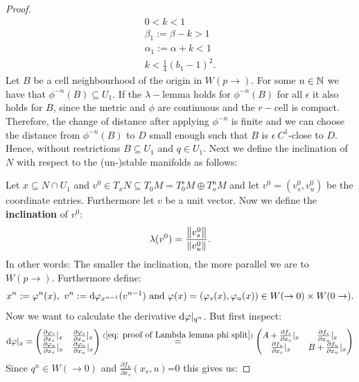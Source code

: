 \begin{proof}
\begin{gather*}
0<k<1 \\
\beta_1:=\beta -k >1 \\
\alpha_1:=\alpha +k <1 \\
k<\frac{1}{4}(b_1-1)^2.
\end{gather*}
Let $B$ be a cell neighbourhood of the origin in $W(p\to )$. For some $n \in \mathbb{N}$ we have that $\phi^{-n}(B)\subseteq U_1$. If the $\lambda-$lemma holds for $\phi^{-n}(B)$ for all $\epsilon$ it also holds for $B$, since the metric and $\phi$ are continuous and the $r-$cell is compact. Therefore, the change of distance after applying $\phi^{-n}$ is finite and we can choose the distance from $\phi^{-n}(B)$ to $D$ small enough such that $B$ is $\epsilon~C^1$-close to $D$. Hence, without restrictions $B\subseteq U_1$ and $q\in U_1$.  Next we define the inclination of $N$ with respect to the (un-)stable manifolds as follows: 

Let $x\subseteq N \cap U_1$ and $v^0\in T_xN\subseteq T_0M=T^s_0M \oplus T^u_oM$ and let $v^0=(v_s^0,v_u^0)$ be the coordinate entries. Furthermore let $v$ be a unit vector. Now we define the \textbf{inclination} of $v^0$:
\begin{align*}
\lambda(v^0)=\frac{\left\lVert v^0_s\right\rVert}{\left\lVert v^0_u\right\rVert}.
\end{align*}
In other words: The smaller the inclination, the more parallel we are to $W(p\to)$. 
Furthermore define:
\begin{align*} x^n:=\varphi^n(x), ~v^n:= \mathop{}\!\mathrm{d} \varphi_{x^{n-1}}(v^{n-1}) \text{ and } \varphi(x)=(\varphi_s(x),\varphi_u(x))\in W(\to 0)\times W(0\to).
\end{align*}
Now we want to calculate the derivative $\mathop{}\!\mathrm{d} \varphi|_{q^n}$. But first inspect:
\begin{align*}
\mathop{}\!\mathrm{d} \varphi|_x=\begin{pmatrix}
\frac{\partial \varphi_s}{\partial x_s}|_{x} & \frac{\partial \varphi_s}{\partial x_u} |_{x}\\
\frac{\partial \varphi_u}{\partial x_s} |_{x}& \frac{\partial \varphi_u}{\partial x_u}|_{x}
\end{pmatrix}\overset{(\ref{eq: proof of Lambda lemma phi split}) }{~=~}
\begin{pmatrix}
A+ \frac{\partial f_s}{\partial x_s}|_{x}& \frac{\partial f_s}{\partial x_u}|_{x}\\
\frac{\partial f_u}{\partial x_s} |_{x} & B+ \frac{\partial f_u}{\partial x_u}|_{x}
\end{pmatrix} 
\end{align*} Since $q^n\in W(\to 0)$ and $\frac{\partial f_u}{\partial x_s}(x_s,u)$=0 this gives us:


\end{proof}
